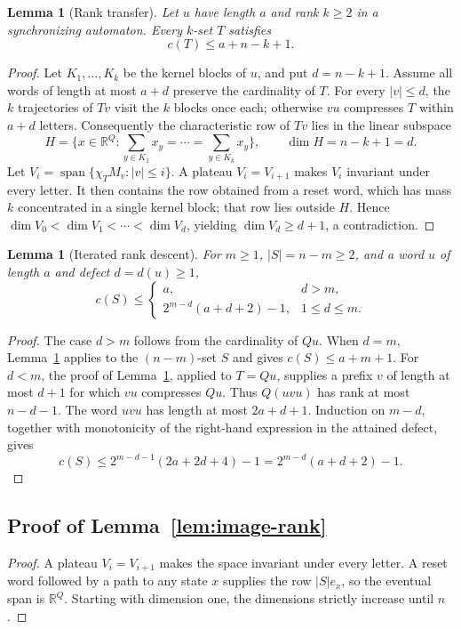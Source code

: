 \documentclass[11pt]{article}
\newtheorem{lemma}[theorem]{Lemma}
\theoremstyle{definition}
\theoremstyle{plain}
\begin{document}
\begin{lemma}[Rank transfer]\label{lem:rank-transfer}
Let $u$ have length $a$ and rank $k\ge2$ in a synchronizing
automaton. Every $k$-set $T$ satisfies
\[
 c(T)\le a+n-k+1.
\]
\end{lemma}
\begin{proof}
Let $K_1,\ldots,K_k$ be the kernel blocks of $u$, and put
$d=n-k+1$. Assume all words of length at most $a+d$ preserve
the cardinality of $T$. For every $|v|\le d$, the $k$ trajectories
of $Tv$ visit the $k$ blocks once each; otherwise $vu$ compresses
$T$ within $a+d$ letters. Consequently the characteristic row
of $Tv$ lies in the linear subspace
\[
 H=\{x\in\mathbb R^Q:
       \sum_{y\in K_1}x_y=\cdots=\sum_{y\in K_k}x_y\},
 \qquad\dim H=n-k+1=d.
\]
Let $V_i=\operatorname{span}\{\chi_TM_v:|v|\le i\}$.
A plateau $V_i=V_{i+1}$ makes $V_i$ invariant under every
letter. It then contains the row obtained from a reset word,
which has mass $k$ concentrated in a single kernel block;
that row lies outside $H$. Hence
$\dim V_0<\dim V_1<\cdots<\dim V_d$, yielding
$\dim V_d\ge d+1$, a contradiction.
\end{proof}

\begin{lemma}[Iterated rank descent]\label{lem:rank-descent}
For $m\ge1$, $|S|=n-m\ge2$, and a word $u$
of length $a$ and defect $d=d(u)\ge1$,
\[
 c(S)\le
 \begin{cases}
 a,&d>m,\\
 2^{m-d}(a+d+2)-1,&1\le d\le m.
 \end{cases}
\]
\end{lemma}
\begin{proof}
The case $d>m$ follows from the cardinality of $Qu$.
When $d=m$, Lemma~\ref{lem:rank-transfer} applies to the
$(n-m)$-set $S$ and gives $c(S)\le a+m+1$.
For $d<m$, the proof of Lemma~\ref{lem:rank-transfer},
applied to $T=Qu$, supplies a prefix $v$ of length at most $d+1$
for which $vu$ compresses $Qu$. Thus
$Q(uvu)$ has rank at most $n-d-1$.
The word $uvu$ has length at most $2a+d+1$.
Induction on $m-d$, together with monotonicity of the
right-hand expression in the attained defect, gives
\[
 c(S)\le
 2^{m-d-1}(2a+2d+4)-1
 =2^{m-d}(a+d+2)-1.
\]

\end{proof}

\subsection*{Proof of Lemma~\ref{lem:image-rank}}
\begin{proof}
A plateau $V_i=V_{i+1}$ makes the space invariant under every letter.
A reset word followed by a path to any state $x$ supplies the row
$|S|e_x$, so the eventual span is $\mathbb R^Q$.
Starting with dimension one, the dimensions strictly increase until $n$.
\end{proof}
\end{document}
